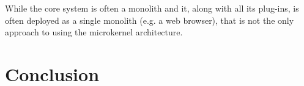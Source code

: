While the core system is often a monolith and it, along with all its plug-ins, is often deployed as a single monolith
(e.g. a web browser), that is not the only approach to using the microkernel architecture.



\section{Conclusion}

